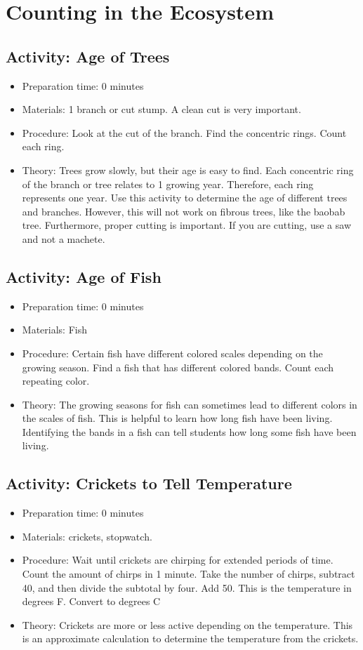 \section{Counting in the Ecosystem}


\subsection{Activity: Age of Trees}
\begin{itemize}
\item{Preparation time: 0 minutes}
\item{Materials: 1 branch or cut stump. A clean cut is very important.}
\item{Procedure: Look at the cut of the branch. Find the concentric rings. Count each ring.}
\item{Theory: Trees grow slowly, but their age is easy to find. Each concentric ring of the branch or tree relates to 1 growing year. Therefore, each ring represents one year. Use this activity to determine the age of different trees and branches. However, this will not work on fibrous trees, like the baobab tree. Furthermore, proper cutting is important. If you are cutting, use a saw and not a machete.}
\end{itemize}

\subsection{Activity: Age of Fish}
\begin{itemize}
\item{Preparation time: 0 minutes}
\item{Materials: Fish}
\item{Procedure: Certain fish have different colored scales depending on the growing season. Find a fish that has different colored bands. Count each repeating color. }
\item{Theory: The growing seasons for fish can sometimes lead to different colors in the scales of fish. This is helpful to learn how long fish have been living. Identifying the bands in a fish can tell students how long some fish have been living.}
\end{itemize}

\subsection{Activity: Crickets to Tell Temperature}
\begin{itemize}
\item{Preparation time: 0 minutes}
\item{Materials: crickets, stopwatch.}
\item{Procedure: Wait until crickets are chirping for extended periods of time. Count the amount of chirps in 1 minute. Take the number of chirps, subtract 40, and then divide the subtotal by four. Add 50. This is the temperature in degrees F. Convert to degrees C}
\item{Theory:  Crickets are more or less active depending on the temperature. This is an approximate calculation to determine the temperature from the crickets.}
\end{itemize}

